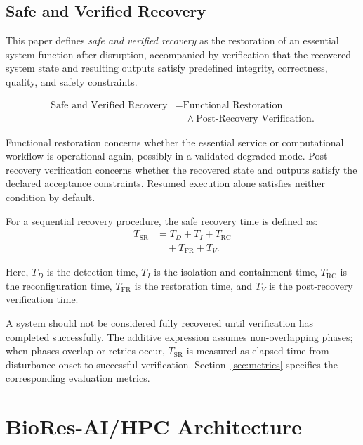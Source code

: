 \documentclass[conference]{IEEEtran}
\begin{document}
\subsection{Safe and Verified Recovery}

This paper defines \emph{safe and verified recovery} as the restoration of an essential system function after disruption, accompanied by verification that the recovered system state and resulting outputs satisfy predefined integrity, correctness, quality, and safety constraints.

\begin{equation}
\begin{split}
\text{Safe and Verified Recovery}
&= \text{Functional Restoration} \\
&\quad \land \text{Post-Recovery Verification}.
\end{split}
\label{eq:safe-verified-recovery}
\end{equation}


Functional restoration concerns whether the essential service or computational workflow is operational again, possibly in a validated degraded mode. Post-recovery verification concerns whether the recovered state and outputs satisfy the declared acceptance constraints. Resumed execution alone satisfies neither condition by default.

For a sequential recovery procedure, the safe recovery time is defined as:
\begin{equation}
\begin{aligned}
T_{\mathrm{SR}}
&= T_D
 + T_I
 + T_{\mathrm{RC}} \\
&\quad + T_{\mathrm{FR}}
 + T_V.
\end{aligned}
\label{eq:safe-recovery-time}
\end{equation}

Here, $T_D$ is the detection time,
$T_I$ is the isolation and containment time,
$T_{\mathrm{RC}}$ is the reconfiguration time,
$T_{\mathrm{FR}}$ is the restoration time, and
$T_V$ is the post-recovery verification time.

A system should not be considered fully recovered until verification has completed successfully. The additive expression assumes non-overlapping phases; when phases overlap or retries occur, $T_{\mathrm{SR}}$ is measured as elapsed time from disturbance onset to successful verification. Section~\ref{sec:metrics} specifies the corresponding evaluation metrics.

\section{BioRes-AI/HPC Architecture}
\end{document}

